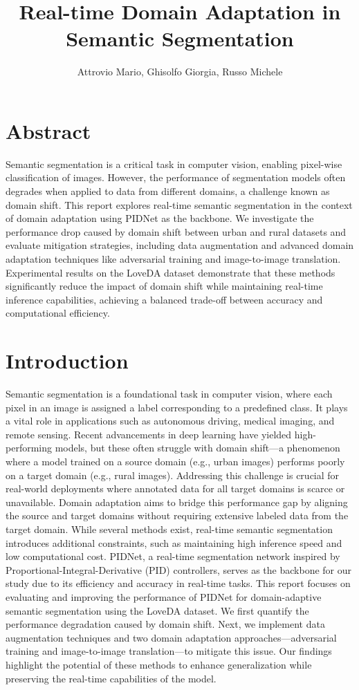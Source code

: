 \documentclass{article}
\title{Real-time Domain Adaptation in
Semantic Segmentation}
\author{Attrovio Mario, Ghisolfo Giorgia, Russo Michele}
\begin{document}
\maketitle


\begin{multicols}{2}
    \section{Abstract}
Semantic segmentation is a critical task in computer vision, enabling pixel-wise classification of images. However, the performance of segmentation models often degrades when applied to data from different domains, a challenge known as domain shift. This report explores real-time semantic segmentation in the context of domain adaptation using PIDNet as the backbone. We investigate the performance drop caused by domain shift between urban and rural datasets and evaluate mitigation strategies, including data augmentation and advanced domain adaptation techniques like adversarial training and image-to-image translation. Experimental results on the LoveDA dataset demonstrate that these methods significantly reduce the impact of domain shift while maintaining real-time inference capabilities, achieving a balanced trade-off between accuracy and computational efficiency.


    
    \section{Introduction}
Semantic segmentation is a foundational task in computer vision, where each pixel in an image is assigned a label corresponding to a predefined class. It plays a vital role in applications such as autonomous driving, medical imaging, and remote sensing. Recent advancements in deep learning have yielded high-performing models, but these often struggle with domain shift—a phenomenon where a model trained on a source domain (e.g., urban images) performs poorly on a target domain (e.g., rural images). Addressing this challenge is crucial for real-world deployments where annotated data for all target domains is scarce or unavailable.
Domain adaptation aims to bridge this performance gap by aligning the source and target domains without requiring extensive labeled data from the target domain. While several methods exist, real-time semantic segmentation introduces additional constraints, such as maintaining high inference speed and low computational cost. PIDNet, a real-time segmentation network inspired by Proportional-Integral-Derivative (PID) controllers, serves as the backbone for our study due to its efficiency and accuracy in real-time tasks.
This report focuses on evaluating and improving the performance of PIDNet for domain-adaptive semantic segmentation using the LoveDA dataset. We first quantify the performance degradation caused by domain shift. Next, we implement data augmentation techniques and two domain adaptation approaches—adversarial training and image-to-image translation—to mitigate this issue. Our findings highlight the potential of these methods to enhance generalization while preserving the real-time capabilities of the model.


\end{multicols}
\end{document}
